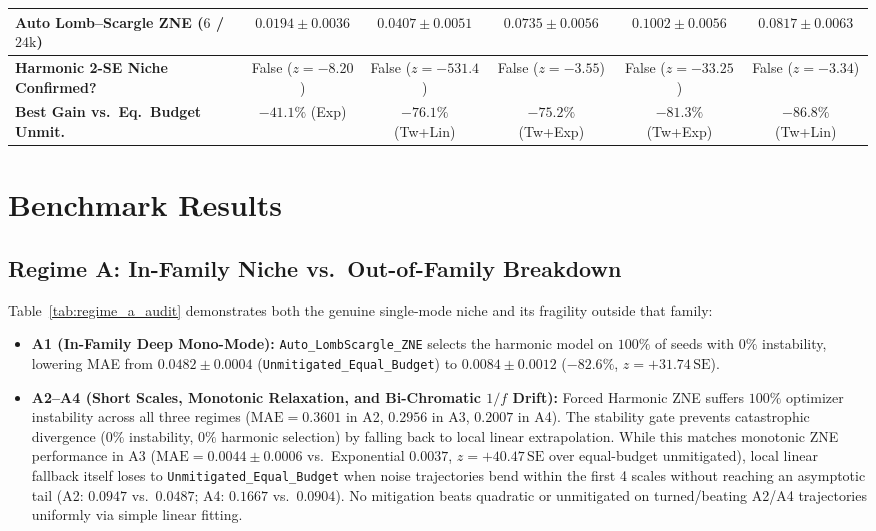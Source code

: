 \documentclass[10pt,twocolumn,a4paper]{article}
\begin{document}
\begin{table}[t]
{\begin{tabular}{lcccc|c}
\textbf{Auto Lomb--Scargle ZNE} ($6$ / $24\mathrm{k}$) & $0.0194 \pm 0.0036$ & $0.0407 \pm 0.0051$ & $0.0735 \pm 0.0056$ & $0.1002 \pm 0.0056$ & $0.0817 \pm 0.0063$ \\
\midrule
\textbf{Harmonic 2-SE Niche Confirmed?} & False ($z=-8.20$) & False ($z=-531.4$) & False ($z=-3.55$) & False ($z=-33.25$) & False ($z=-3.34$) \\
\textbf{Best Gain vs.\ Eq.\ Budget Unmit.} & $-41.1\%$ (Exp) & $\mathbf{-76.1\%}$ (Tw+Lin) & $\mathbf{-75.2\%}$ (Tw+Exp) & $\mathbf{-81.3\%}$ (Tw+Exp) & $\mathbf{-86.8\%}$ (Tw+Lin) \\
\bottomrule
\end{tabular}%
}
\end{table}

\section{Benchmark Results}

\subsection{Regime A: In-Family Niche vs.\ Out-of-Family Breakdown}
Table~\ref{tab:regime_a_audit} demonstrates both the genuine single-mode niche and its fragility outside that family:
\begin{itemize}
    \item \textbf{A1 (In-Family Deep Mono-Mode):} \texttt{Auto\_LombScargle\_ZNE} selects the harmonic model on $100\%$ of seeds with $0\%$ instability, lowering MAE from $0.0482 \pm 0.0004$ (\texttt{Unmitigated\_Equal\_Budget}) to $0.0084 \pm 0.0012$ ($-82.6\%$, $z = +31.74\,\mathrm{SE}$).
    \item \textbf{A2--A4 (Short Scales, Monotonic Relaxation, and Bi-Chromatic $1/f$ Drift):} Forced Harmonic ZNE suffers $100\%$ optimizer instability across all three regimes ($\mathrm{MAE} = 0.3601$ in A2, $0.2956$ in A3, $0.2007$ in A4). The stability gate prevents catastrophic divergence ($0\%$ instability, $0\%$ harmonic selection) by falling back to local linear extrapolation. While this matches monotonic ZNE performance in A3 ($\mathrm{MAE} = 0.0044 \pm 0.0006$ vs.\ Exponential $0.0037$, $z = +40.47\,\mathrm{SE}$ over equal-budget unmitigated), local linear fallback itself loses to \texttt{Unmitigated\_Equal\_Budget} when noise trajectories bend within the first 4 scales without reaching an asymptotic tail (A2: $0.0947$ vs.\ $0.0487$; A4: $0.1667$ vs.\ $0.0904$). No mitigation beats quadratic or unmitigated on turned/beating A2/A4 trajectories uniformly via simple linear fitting.
\end{itemize}
\end{document}
